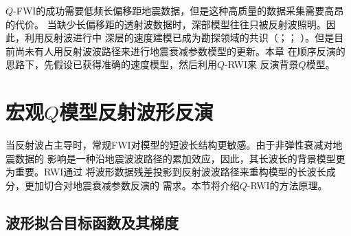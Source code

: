 $Q$-FWI的成功需要低频长偏移距地震数据，但是这种高质量的数据采集需要高昂的代价。
当缺少长偏移距的透射波数据时，深部模型往往只被反射波照明。因此，利用反射波进行中
深层的速度建模已成为勘探领域的共识（；；
）。但是目前尚未有人用反射波波路径来进行地震衰减参数模型的更新。本章
在顺序反演的思路下，先假设已获得准确的速度模型，然后利用$Q$-RWI来
反演背景$Q$模型。

\vspace{0.7cm}
\section{宏观$Q$模型反射波形反演}
\vspace{0.8cm}

当反射波占主导时，常规FWI对模型的短波长结构更敏感。由于非弹性衰减对地震数据的
影响是一种沿地震波波路径的累加效应，因此，其长波长的背景模型更为重要。RWI通过
将波形数据残差投影到反射波波路径来重构模型的长波长成分，更加切合对地震衰减参数反演的
需求。本节将介绍$Q$-RWI的方法原理。

\vspace{0.7cm}
\subsection{波形拟合目标函数及其梯度}
\vspace{0.8cm}

